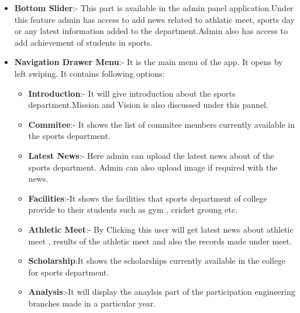 	\begin{itemize}
		\item \textbf{Bottom Slider}:- This part is available in the admin panel application.Under this feature admin has access to add news related to athlatic meet, sports day or any latest information added to the department.Admin also has access to add achievement of students in sports. 
				
		\item \textbf{Navigation Drawer Menu}:- It is the main menu of the app. It opens by left swiping. It contains following options:
		\begin{itemize}
			\item \textbf{Introduction}:- It will give introduction about the sports department.Mission and Vision is also discussed under this pannel.
			
			\item \textbf{Commitee}:- It shows the list of commitee members currently available in the sports department.
			
			\item \textbf{Latest News}:- Here admin can upload the latest news about of the sports department. Admin can also upload image if required with the news.
			
			\item \textbf{Facilities}:-It shows the facilities that sports department of college provide to their students such as gym , cricket groung etc.
			
			\item \textbf{Athletic Meet}:- By Clicking this user will get latest news about athletic meet , results of the athletic meet and also the records made under meet.
			
			\item \textbf{Scholarship}:It shows the scholarships currently available in the college for sports department.
			
			\item \textbf{Analysis}:-It will display the anaylsis part of the participation engineering branches made in a particular year.
			

\end{itemize}
\end{itemize}
